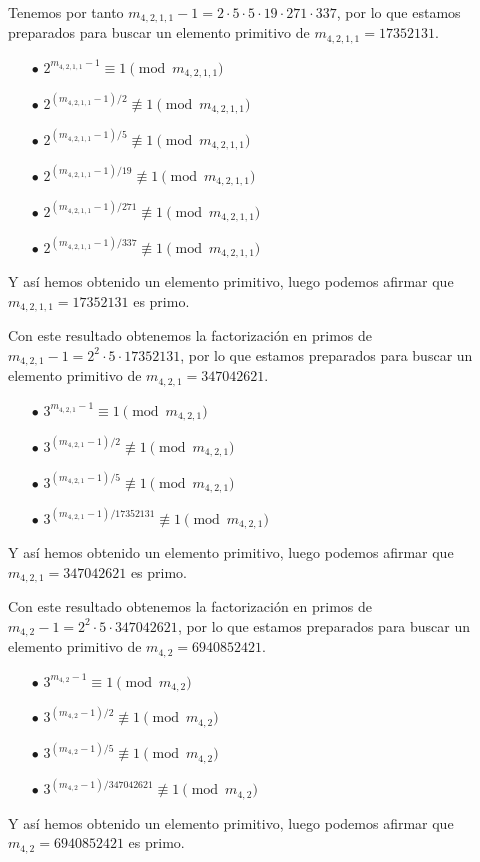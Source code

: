 \documentclass[fleqn]{article}
\begin{document}
    Tenemos por tanto $m_{4,2,1,1} - 1 = 2 \cdot 5 \cdot 5 \cdot 19 \cdot 271 \cdot 337$, por lo que estamos preparados para buscar un elemento primitivo de $m_{4,2,1,1} = 17352131$.
    \begin{enumerate}
        \item[$\bullet$] $2^{m_{4,2,1,1} -1} \equiv 1 \pmod{m_{4,2,1,1}}$
        \item[$\bullet$] $2^{(m_{4,2,1,1} -1)/2} \not\equiv 1 \pmod{m_{4,2,1,1}}$
        \item[$\bullet$] $2^{(m_{4,2,1,1} -1)/5} \not\equiv 1 \pmod{m_{4,2,1,1}}$
        \item[$\bullet$] $2^{(m_{4,2,1,1} -1)/19} \not\equiv 1 \pmod{m_{4,2,1,1}}$
        \item[$\bullet$] $2^{(m_{4,2,1,1} -1)/271} \not\equiv 1 \pmod{m_{4,2,1,1}}$
        \item[$\bullet$] $2^{(m_{4,2,1,1} -1)/337} \not\equiv 1 \pmod{m_{4,2,1,1}}$
    \end{enumerate}
    Y así hemos obtenido un elemento primitivo, luego podemos afirmar que $m_{4,2,1,1} = 17352131$ es primo.

    Con este resultado obtenemos la factorización en primos de $m_{4,2,1} - 1 = 2^2 \cdot 5 \cdot 17352131$, por lo que estamos preparados para buscar un elemento primitivo de $m_{4,2,1} = 347042621$.
    \begin{enumerate}
        \item[$\bullet$] $3^{m_{4,2,1} -1} \equiv 1 \pmod{m_{4,2,1}}$
        \item[$\bullet$] $3^{(m_{4,2,1} -1)/2} \not\equiv 1 \pmod{m_{4,2,1}}$
        \item[$\bullet$] $3^{(m_{4,2,1} -1)/5} \not\equiv 1 \pmod{m_{4,2,1}}$ 
        \item[$\bullet$] $3^{(m_{4,2,1} -1)/17352131} \not\equiv 1 \pmod{m_{4,2,1}}$
    \end{enumerate}
    Y así hemos obtenido un elemento primitivo, luego podemos afirmar que $m_{4,2,1} = 347042621$ es primo.

    Con este resultado obtenemos la factorización en primos de $m_{4,2} - 1 = 2^2 \cdot 5 \cdot 347042621$, por lo que estamos preparados para buscar un elemento primitivo de $m_{4,2} = 6940852421$.
    \begin{enumerate}
        \item[$\bullet$] $3^{m_{4,2} -1} \equiv 1 \pmod{m_{4,2}}$
        \item[$\bullet$] $3^{(m_{4,2} -1)/2} \not\equiv 1 \pmod{m_{4,2}}$
        \item[$\bullet$] $3^{(m_{4,2} -1)/5} \not\equiv 1 \pmod{m_{4,2}}$ 
        \item[$\bullet$] $3^{(m_{4,2} -1)/347042621} \not\equiv 1 \pmod{m_{4,2}}$
    \end{enumerate}
    Y así hemos obtenido un elemento primitivo, luego podemos afirmar que $m_{4,2} = 6940852421$ es primo.
\end{document}

